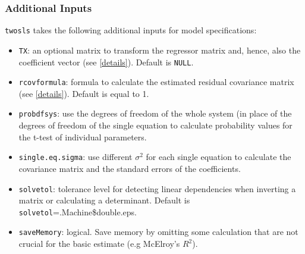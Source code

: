 \subsubsection{Additional Inputs}
\texttt{twosls} takes the following additional inputs for model
specifications:
\begin{itemize}
\item \texttt{TX}: an optional matrix to transform the regressor
matrix and, hence, also the coefficient vector (see \ref{details}). Default is \texttt{NULL}.
\item \texttt{rcovformula}: formula to calculate the estimated residual covariance
matrix (see \ref{details}). Default is equal to 1.
\item \texttt{probdfsys}: use the degrees of freedom of the whole system
(in place of the degrees of freedom of the single equation to calculate probability
values for the t-test of individual parameters. 
\item \texttt{single.eq.sigma}: use different $\sigma^2$ for each single
equation to calculate the covariance matrix and the standard errors of the coefficients.
\item \texttt{solvetol}: tolerance level for detecting linear dependencies when 
inverting a matrix or calculating a determinant. Default is \texttt {solvetol}=.Machine\$double.eps.
\item \texttt{saveMemory}: logical. Save memory by omitting some calculation that are
not crucial for the basic estimate (e.g McElroy's $R^2$).
\end{itemize}
